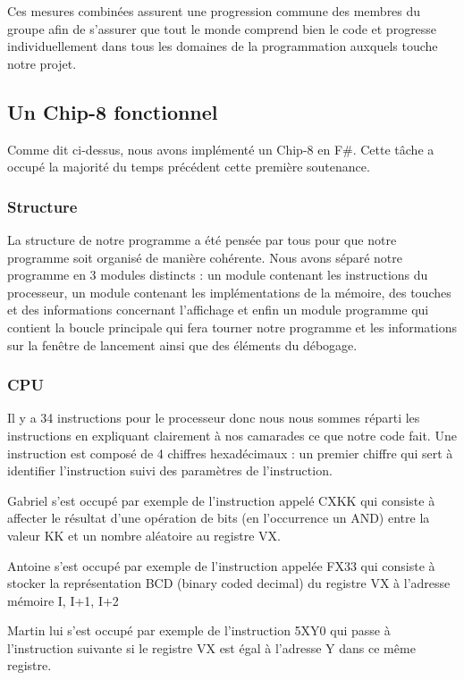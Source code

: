 \documentclass[12pt, a4paper]{article}
\begin{document}
\bigskip
Ces mesures combinées assurent une progression commune des \linebreak membres du groupe afin de s'assurer que tout le monde comprend bien le code et progresse individuellement dans tous les domaines de la programmation auxquels touche notre projet.

\pagebreak

\subsection {Un Chip-8 fonctionnel}
Comme dit ci-dessus, nous avons implémenté un Chip-8 en F\#. Cette tâche a occupé la majorité du temps précédent cette première soutenance.

\subsubsection{\large Structure}
La structure de notre programme a été pensée par tous pour que notre programme soit organisé de manière cohérente. Nous avons séparé notre programme en 3 modules distincts : un module contenant les instructions du processeur, un module contenant les implémentations de la mémoire, des touches et des informations concernant l'affichage et enfin un module programme qui contient la boucle principale qui fera tourner notre programme et les informations sur la fenêtre de lancement ainsi que des éléments du débogage.

\subsubsection{\large CPU}
Il y a 34 instructions pour le processeur donc nous nous sommes réparti les instructions en expliquant clairement à nos camarades ce que notre code fait. Une instruction est composé de 4 chiffres hexadécimaux : un premier chiffre qui sert à identifier l'instruction suivi des paramètres de l'instruction. 

Gabriel s'est occupé par exemple de l'instruction appelé CXKK qui consiste à affecter le résultat d'une opération de bits (en l'occurrence un AND) entre la valeur KK et un nombre aléatoire au registre VX.

Antoine s'est occupé par exemple de l'instruction appelée FX33 qui consiste à stocker la représentation BCD (binary coded decimal) du registre VX à l'adresse mémoire I,  I+1, I+2

Martin lui s'est occupé par exemple de l'instruction 5XY0 qui passe à l'instruction suivante si le registre VX est égal à l'adresse Y dans ce même registre.
\end{document}
